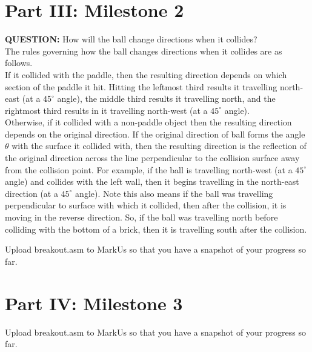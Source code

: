 \documentclass{article}
\begin{document}
\newpage

\section{Part III: Milestone 2}

\item \textbf{QUESTION: } How will the ball change directions when it collides? \\[0.4em]
The rules governing how the ball changes directions when it collides are as follows. \\[0.4em]
If it collided with the paddle, then the resulting direction depends on which section of the paddle it hit.
Hitting the leftmost third results it travelling north-east (at a $45^\circ$ angle), the middle third results it travelling north, and the rightmost third results in it travelling north-west (at a $45^\circ$ angle). \\[0.4em]
Otherwise, if it collided with a non-paddle object then the resulting direction depends on the original direction.
If the original direction of ball forms the angle $\theta$ with the surface it collided with, 
then the resulting direction is the reflection of the original direction across the line perpendicular to the collision surface away from the collision point.
For example, if the ball is travelling north-west (at a $45^\circ$ angle) and collides with the left wall, then it begins travelling in the north-east direction (at a $45^\circ$ angle).
Note this also means if the ball was travelling perpendicular to surface with which it collided, then after the collision, it is moving in the reverse direction.
So, if the ball was travelling north before colliding with the bottom of a brick, then it is travelling south after the collision.
\item Upload breakout.asm to MarkUs so that you have a snapshot of your progress so far.

\section{Part IV: Milestone 3}
\item Upload breakout.asm to MarkUs so that you have a snapshot of your progress so far.
\end{document}
